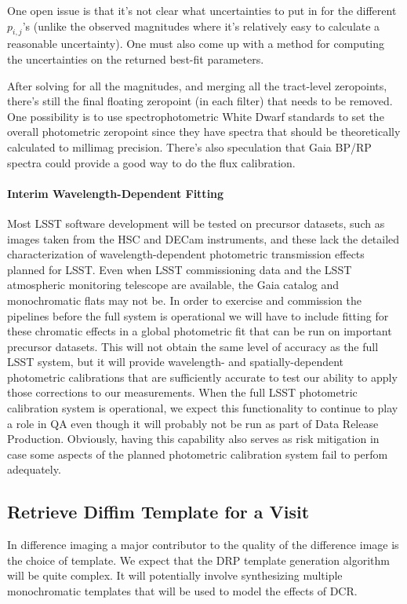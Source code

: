One open issue is that it's not clear what uncertainties to put in for the different $p_{i,j}$'s (unlike the observed magnitudes where it's relatively easy to calculate a reasonable uncertainty). One must also come up with a method for computing the uncertainties on the returned best-fit parameters.

After solving for all the magnitudes, and merging all the tract-level zeropoints, there's still the final floating zeropoint (in each filter) that needs to be removed.  One possibility is to use spectrophotometric White Dwarf standards to set the overall photometric zeropoint since they have spectra that should be theoretically calculated to millimag precision.  There's also speculation that Gaia BP/RP spectra could provide a good way to do the flux calibration.

\paragraph{Interim Wavelength-Dependent Fitting}
\label{sec:acInterimPhotometricFit}

Most LSST software development will be tested on precursor datasets, such as images taken from the HSC and DECam instruments, and these lack the detailed characterization of wavelength-dependent photometric transmission effects planned for LSST.  Even when LSST commissioning data and the LSST atmospheric monitoring telescope are available, the Gaia catalog and monochromatic flats may not be.  In order to exercise and commission the pipelines before the full system is operational we will have to include fitting for these chromatic effects in a global photometric fit that can be run on important precursor datasets.  This will not obtain the same level of accuracy as the full LSST system, but it will provide wavelength- and spatially-dependent photometric calibrations that are sufficiently accurate to test our ability to apply those corrections to our measurements.  When the full LSST photometric calibration system is operational, we expect this functionality to continue to play a role in QA even though it will probably not be run as part of Data Release Production.  Obviously, having this capability also serves as risk mitigation in case some aspects of the planned photometric calibration system fail to perfom adequately.

\subsection{Retrieve Diffim Template for a Visit}
\label{sec:acRetrieveTemplate}
In difference imaging a major contributor to the quality of the difference image is the choice of template.  We expect that the DRP template generation algorithm will be quite complex.  It will potentially involve synthesizing multiple monochromatic templates that will be used to model the effects of DCR.

